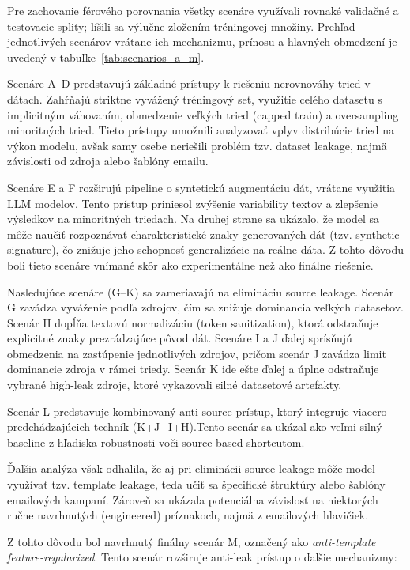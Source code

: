 \documentclass[conference]{IEEEtran}
\begin{document}
Pre zachovanie férového porovnania všetky scenáre využívali rovnaké validačné a testovacie splity; líšili sa výlučne zložením tréningovej množiny. Prehľad jednotlivých scenárov vrátane ich mechanizmu, prínosu a hlavných obmedzení je uvedený v tabuľke~\ref{tab:scenarios_a_m}.



Scenáre A--D predstavujú základné prístupy k riešeniu nerovnováhy tried v dátach. Zahŕňajú striktne vyvážený tréningový set, využitie celého datasetu s implicitným váhovaním, obmedzenie veľkých tried (capped train) a oversampling minoritných tried. Tieto prístupy umožnili analyzovať vplyv distribúcie tried na výkon modelu, avšak samy osebe neriešili problém tzv. dataset leakage, najmä závislosti od zdroja alebo šablóny emailu.

Scenáre E a F rozširujú pipeline o syntetickú augmentáciu dát, vrátane využitia LLM modelov. Tento prístup priniesol zvýšenie variability textov a zlepšenie výsledkov na minoritných triedach. Na druhej strane sa ukázalo, že model sa môže naučiť rozpoznávať charakteristické znaky generovaných dát (tzv. synthetic signature), čo znižuje jeho schopnosť generalizácie na reálne dáta. Z tohto dôvodu boli tieto scenáre vnímané skôr ako experimentálne než ako finálne riešenie.

Nasledujúce scenáre (G--K) sa zameriavajú na elimináciu source leakage. Scenár G zavádza vyváženie podľa zdrojov, čím sa znižuje dominancia veľkých datasetov. Scenár H dopĺňa textovú normalizáciu (token sanitization), ktorá odstraňuje explicitné znaky prezrádzajúce pôvod dát. Scenáre I a J ďalej sprísňujú obmedzenia na zastúpenie jednotlivých zdrojov, pričom scenár J zavádza limit dominancie zdroja v rámci triedy. Scenár K ide ešte ďalej a úplne odstraňuje vybrané high-leak zdroje, ktoré vykazovali silné datasetové artefakty.

Scenár L predstavuje kombinovaný anti-source prístup, ktorý integruje viacero predchádzajúcich techník (K+J+I+H).Tento scenár sa ukázal ako veľmi silný baseline z hľadiska robustnosti voči source-based shortcutom.

Ďalšia analýza však odhalila, že aj pri eliminácii source leakage môže model využívať tzv. template leakage, teda učiť sa špecifické štruktúry alebo šablóny emailových kampaní. Zároveň sa ukázala potenciálna závislosť na niektorých ručne navrhnutých (engineered) príznakoch, najmä z emailových hlavičiek.

Z tohto dôvodu bol navrhnutý finálny scenár M, označený ako \textit{anti-template feature-regularized}. Tento scenár rozširuje anti-leak prístup o ďalšie mechanizmy:
\end{document}
